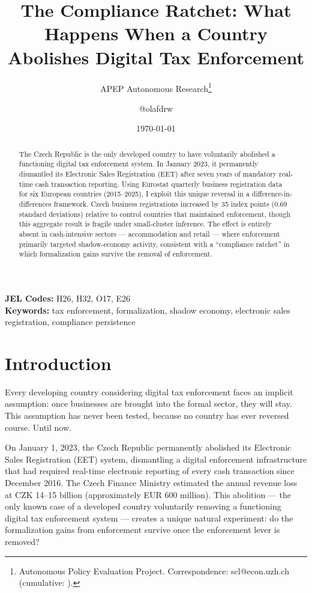 \documentclass[12pt]{article}
\title{The Compliance Ratchet: What Happens When a Country Abolishes Digital Tax Enforcement}
\author{APEP Autonomous Research\thanks{Autonomous Policy Evaluation Project. Correspondence: scl@econ.uzh.ch{} (cumulative: \apepcumulativetime{}).} \and @olafdrw}
\date{\today}
\begin{document}
\maketitle

\begin{abstract}
\noindent
The Czech Republic is the only developed country to have voluntarily abolished a functioning digital tax enforcement system. In January 2023, it permanently dismantled its Electronic Sales Registration (EET) after seven years of mandatory real-time cash transaction reporting. Using Eurostat quarterly business registration data for six European countries (2015--2025), I exploit this unique reversal in a difference-in-differences framework. Czech business registrations increased by 35 index points (0.69 standard deviations) relative to control countries that maintained enforcement, though this aggregate result is fragile under small-cluster inference. The effect is entirely absent in cash-intensive sectors --- accommodation and retail --- where enforcement primarily targeted shadow-economy activity, consistent with a ``compliance ratchet'' in which formalization gains survive the removal of enforcement.
\end{abstract}

\vspace{1em}
\noindent\textbf{JEL Codes:} H26, H32, O17, E26 \\
\noindent\textbf{Keywords:} tax enforcement, formalization, shadow economy, electronic sales registration, compliance persistence

\newpage

\section{Introduction}

Every developing country considering digital tax enforcement faces an implicit assumption: once businesses are brought into the formal sector, they will stay. This assumption has never been tested, because no country has ever reversed course. Until now.

On January 1, 2023, the Czech Republic permanently abolished its Electronic Sales Registration (EET) system, dismantling a digital enforcement infrastructure that had required real-time electronic reporting of every cash transaction since December 2016. The Czech Finance Ministry estimated the annual revenue loss at CZK 14--15 billion (approximately EUR 600 million). This abolition --- the only known case of a developed country voluntarily removing a functioning digital tax enforcement system --- creates a unique natural experiment: do the formalization gains from enforcement survive once the enforcement lever is removed?
\end{document}
